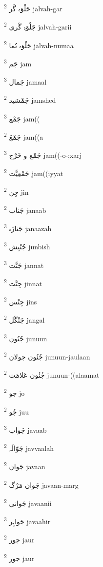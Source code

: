 \documentclass[12pt]{article}
\begin{document}
\begin{multicols}{5}
{\ur جَلْوَہ گَر}   \textsuperscript{2} jalvah-gar

{\ur جَلْوَہ گَری}   \textsuperscript{2} jalvah-garii

{\ur جَلْوَہ نُما}   \textsuperscript{2} jalvah-numaa

{\ur جَم}   \textsuperscript{3} jam

{\ur جَمال}   \textsuperscript{3} jamaal

{\ur جَمْشید}   \textsuperscript{2} jamshed

{\ur جَمْع}   \textsuperscript{3} jam((

{\ur جَمْعَ}   \textsuperscript{2} jam((a

{\ur جَمْع و خَرْج}   \textsuperscript{3} jam((-o-;xarj

{\ur جَمْعِیَّت}   \textsuperscript{2} jam((iyyat

{\ur جِن}   \textsuperscript{2} jin

{\ur جَناب}   \textsuperscript{2} janaab

{\ur جَنازَہ}   \textsuperscript{3} janaazah

{\ur جُنْبِش}   \textsuperscript{3} junbish

{\ur جَنَّت}   \textsuperscript{3} jannat

{\ur جِنَّت}   \textsuperscript{2} jinnat

{\ur جِنْس}   \textsuperscript{2} jins

{\ur جَنْگَل}   \textsuperscript{2} jangal

{\ur جُنُون}   \textsuperscript{3} junuun

{\ur جُنُون جولان}   \textsuperscript{2} junuun-jaulaan

{\ur جُنُون عَلامَت}   \textsuperscript{2} junuun-((alaamat

{\ur جو}   \textsuperscript{2} jo

{\ur جُو}   \textsuperscript{2} juu

{\ur جَواب}   \textsuperscript{3} javaab

{\ur جَوّالَہ}   \textsuperscript{2} javvaalah

{\ur جَوان}   \textsuperscript{2} javaan

{\ur جَوان مَرْگ}   \textsuperscript{2} javaan-marg

{\ur جَوانی}   \textsuperscript{2} javaanii

{\ur جَواہِر}   \textsuperscript{3} javaahir

{\ur جور}   \textsuperscript{2} jaur

{\ur جور}   \textsuperscript{2} jaur


\end{multicols}
\end{document}
